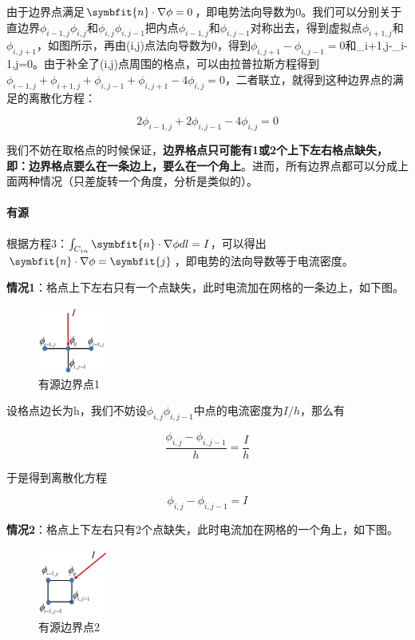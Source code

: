 \documentclass[10pt, a4paper]{article}
\newcommand\vbf{\symbfit}
\begin{document}
    由于边界点满足$\vbf{n}\cdot \nabla\phi=0$，即电势法向导数为0。我们可以分别关于直边界$\phi_{i-1,j}\phi_{i,j}$和$\phi_{i,j}\phi_{i,j-1}$把内点$\phi_{i-1,j}$和$\phi_{i,j-1}$对称出去，得到虚拟点$\phi_{i+1,j}$和$\phi_{i,j+1}$，如图所示，再由(i,j)点法向导数为0，得到$\phi_{i,j+1}-\phi_{i,j-1}=0$和\phi_{i+1,j}-\phi_{i-1,j}=0。由于补全了(i,j)点周围的格点，可以由拉普拉斯方程得到
    $\phi_{i-1,j}+\phi_{i+1,j}+\phi_{i,j-1}+\phi_{i,j+1}-4\phi_{i,j}=0$，二者联立，就得到这种边界点的满足的离散化方程：

    \[2\phi_{i-1,j}+2\phi_{i,j-1}-4\phi_{i,j}=0\]

    我们不妨在取格点的时候保证，\textbf{边界格点只可能有1或2个上下左右格点缺失，即：边界格点要么在一条边上，要么在一个角上}。进而，所有边界点都可以分成上面两种情况（只差旋转一个角度，分析是类似的）。

    \paragraph{有源}

    根据方程3：$\int_{C_{in}} \vbf{n} \cdot \nabla\phi  dl= I$，可以得出$\vbf{n} \cdot \nabla\phi=\vbf{j}$，即电势的法向导数等于电流密度。

    \textbf{情况1}：格点上下左右只有一个点缺失，此时电流加在网格的一条边上，如下图。

    \begin{figure}[H]
        \centering
        \includegraphics[width=0.2\textwidth]{有源边界点1.png}
        \caption{有源边界点1}\label{fig:有源边界点1}
    \end{figure}

    设格点边长为h，我们不妨设$\phi_{i,j}\phi_{i,j-1}$中点的电流密度为$I/h$，那么有

    \[\frac{\phi_{i,j}-\phi_{i,j-1}}{h}=\frac{I}{h}\]

    于是得到离散化方程

    \[{\phi_{i,j}-\phi_{i,j-1}}={I}\]

    \textbf{情况2}：格点上下左右只有2个点缺失，此时电流加在网格的一个角上，如下图。

    \begin{figure}[H]
        \centering
        \includegraphics[width=0.2\textwidth]{有源边界点2.png}
        \caption{有源边界点2}\label{fig:有源边界点2}
    \end{figure}
\end{document}
